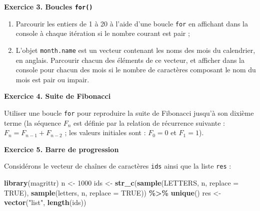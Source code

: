 \documentclass[
  11pt,
]{book}
\makeatletter
\newenvironment{Shaded}{\begin{snugshade}}{\end{snugshade}}
\newcommand{\DataTypeTok}[1]{\textcolor[rgb]{0.13,0.29,0.53}{#1}}
\newcommand{\DecValTok}[1]{\textcolor[rgb]{0.00,0.00,0.81}{#1}}
\newcommand{\KeywordTok}[1]{\textcolor[rgb]{0.13,0.29,0.53}{\textbf{#1}}}
\newcommand{\NormalTok}[1]{#1}
\newcommand{\OperatorTok}[1]{\textcolor[rgb]{0.81,0.36,0.00}{\textbf{#1}}}
\newcommand{\OtherTok}[1]{\textcolor[rgb]{0.56,0.35,0.01}{#1}}
\newcommand{\StringTok}[1]{\textcolor[rgb]{0.31,0.60,0.02}{#1}}
\providecommand{\tightlist}{%
  \setlength{\itemsep}{0pt}\setlength{\parskip}{0pt}}
\numberwithin{equation}{section}
\numberwithin{countremarque}{section}
\newenvironment{exframe}{%
 \def\at@end@of@exframe{}%
 \ifinner\ifhmode%
  \def\at@end@of@exframe{\end{minipage}}%
  \begin{minipage}{\columnwidth}%
 \fi\fi%
 \def\FrameCommand##1{\hskip\@totalleftmargin \hskip-\fboxsep
 \colorbox{shadecolorex}{##1}\hskip-\fboxsep
     \hskip-\linewidth \hskip-\@totalleftmargin \hskip\columnwidth}%
 \MakeFramed {\advance\hsize-\width
   \@totalleftmargin\z@ \linewidth\hsize
   \@setminipage}}%
 {\par\unskip\endMakeFramed%
 \at@end@of@exframe}
\makeatother
\begin{document}
\begin{exframe}
\textbf{Exercice 3. Boucles \texttt{for()}}

\begin{enumerate}
\def\labelenumi{\arabic{enumi}.}
\tightlist
\item
  Parcourir les entiers de 1 à 20 à l'aide d'une boucle \texttt{for} en affichant dans la console à chaque itération si le nombre courant est pair ;
\item
  L'objet \texttt{month.name} est un vecteur contenant les noms des mois du calendrier, en anglais. Parcourir chacun des éléments de ce vecteur, et afficher dans la console pour chacun des mois si le nombre de caractères composant le nom du mois est pair ou impair.
\end{enumerate}
\end{exframe}

\begin{exframe}
\textbf{Exercice 4. Suite de Fibonacci}

Utiliser une boucle \texttt{for} pour reproduire la suite de Fibonacci jusqu'à son dixième terme (la séquence \(F_n\) est définie par la relation de récurrence suivante : \(F_{n} = F_{n-1} + F_{n-2}\) ; les valeurs initiales sont : \(F_0 = 0\) et \(F_{1} = 1\)).
\end{exframe}

\begin{exframe}
\textbf{Exercice 5. Barre de progression}

Considérons le vecteur de chaînes de caractères \texttt{ids} ainsi que la liste \texttt{res} :
\end{exframe}

\begin{Shaded}
\begin{Highlighting}[]
\KeywordTok{library}\NormalTok{(magrittr)}
\NormalTok{n \textless{}{-}}\StringTok{ }\DecValTok{1000}
\NormalTok{ids \textless{}{-}}\StringTok{ }
\StringTok{  }\KeywordTok{str\_c}\NormalTok{(}\KeywordTok{sample}\NormalTok{(LETTERS, n, }\DataTypeTok{replace =} \OtherTok{TRUE}\NormalTok{),}
        \KeywordTok{sample}\NormalTok{(letters, n, }\DataTypeTok{replace =} \OtherTok{TRUE}\NormalTok{)) }\OperatorTok{\%\textgreater{}\%}\StringTok{ }
\StringTok{  }\KeywordTok{unique}\NormalTok{()}
\NormalTok{res \textless{}{-}}\StringTok{ }\KeywordTok{vector}\NormalTok{(}\StringTok{"list"}\NormalTok{, }\KeywordTok{length}\NormalTok{(ids))}
\end{Highlighting}
\end{Shaded}
\end{document}

